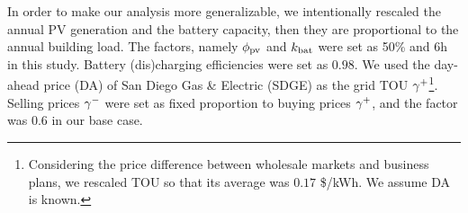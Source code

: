 In order to make our analysis more generalizable, we intentionally rescaled the annual PV generation and the battery capacity, then they are proportional to the annual building load. The factors, namely $\phi_\text{pv}$ and $k_\text{bat}$ were set as 50\% and 6h in this study. Battery (dis)charging efficiencies were set as $0.98$. 
We used the day-ahead price (DA) of San Diego Gas \& Electric (SDGE) as the grid TOU $\gamma^+$\footnote{Considering the price difference between wholesale markets and business plans, we rescaled TOU so that its average was $0.17$ \$/kWh. We assume DA is known.}. Selling prices $\gamma^-$ were set as fixed proportion to buying prices $\gamma^+$, and the factor was $0.6$ in our base case.
